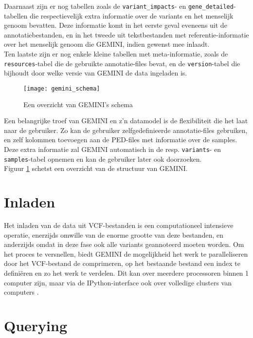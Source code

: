 Daarnaast zijn er nog tabellen zoals de \texttt{variant\_impacts}- en \texttt{gene\_detailed}-tabellen die respectievelijk extra informatie over de variants en het menselijk genoom bevatten. Deze informatie komt in het eerste geval eveneens uit de annotatiebestanden, en in het tweede uit tekstbestanden met referentie-informatie over het menselijk genoom die GEMINI, indien gewenst mee inlaadt.\\
Ten laatste zijn er nog enkele kleine tabellen met meta-informatie, zoals de \texttt{resources}-tabel die de gebruikte annotatie-files bevat, en de \texttt{version}-tabel die bijhoudt door welke versie van GEMINI de data ingeladen is.\\

\begin{figure}[!h]
\texttt{[image: gemini\_schema]}
\caption{Een overzicht van GEMINI's schema}
\label{gemini_schema_pic}
\end{figure}

Een belangrijke troef van GEMINI en z'n datamodel is de flexibiliteit die het laat naar de gebruiker. Zo kan de gebruiker zelfgedefinieerde annotatie-files gebruiken, en zelf kolommen toevoegen aan de PED-files met informatie over de samples. Deze extra informatie zal GEMINI automatisch in de resp. \texttt{variants}- en \texttt{samples}-tabel opnemen en kan de gebruiker later ook doorzoeken.\\

Figuur \ref{gemini_schema_pic} schetst een overzicht van de structuur van GEMINI.


\section{Inladen}
Het inladen van de data uit VCF-bestanden is een computationeel intensieve operatie, enerzijds omwille van de enorme grootte van deze bestanden, en anderzijds omdat in deze fase ook alle variants geannoteerd moeten worden. Om het proces te versnellen, biedt GEMINI de mogelijkheid het werk te paralleliseren door het VCF-bestand de comprimeren, op het bestaande bestand een index te defini\"eren en zo het werk te verdelen. Dit kan over meerdere processoren binnen 1 computer zijn, maar via de IPython-interface ook over volledige clusters van computers \cite{PER-GRA:2007}.\\

\newpage
\section{Querying}

